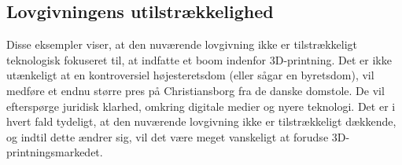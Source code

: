 \subsection{Lovgivningens utilstrækkelighed}
 
Disse eksempler viser, at den nuværende lovgivning ikke er tilstrækkeligt teknologisk fokuseret til, at indfatte et boom indenfor 3D-printning. Det er ikke utænkeligt at en kontroversiel højesteretsdom (eller sågar en byretsdom), vil medføre et endnu større pres på Christiansborg fra de danske domstole. De vil efterspørge juridisk klarhed, omkring digitale medier og nyere teknologi.
Det er i hvert fald tydeligt, at den nuværende lovgivning ikke er tilstrækkeligt dækkende, og indtil dette ændrer sig, vil det være meget vanskeligt at forudse 3D-printningsmarkedet.

